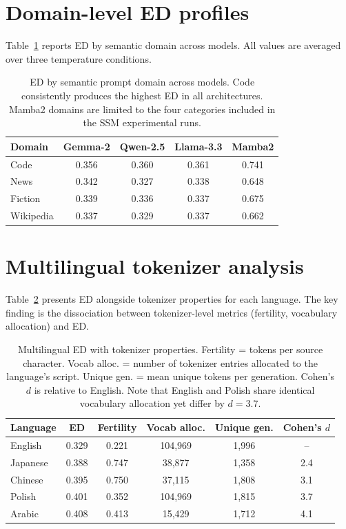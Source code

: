 \documentclass{article}
\begin{document}
\section{Domain-level ED profiles}
\label{app:domains}

Table~\ref{tab:domains} reports ED by semantic domain across models. All values are averaged over three temperature conditions.

\begin{table}[H]
\centering
\small
\begin{tabular}{lcccc}
\toprule
\textbf{Domain} & \textbf{Gemma-2} & \textbf{Qwen-2.5} & \textbf{Llama-3.3} & \textbf{Mamba2} \\
\midrule
Code & 0.356 & 0.360 & 0.361 & 0.741 \\
News & 0.342 & 0.327 & 0.338 & 0.648 \\
Fiction & 0.339 & 0.336 & 0.337 & 0.675 \\
Wikipedia & 0.337 & 0.329 & 0.337 & 0.662 \\
\bottomrule
\end{tabular}
\caption{ED by semantic prompt domain across models. Code consistently produces the highest ED in all architectures. Mamba2 domains are limited to the four categories included in the SSM experimental runs.}
\label{tab:domains}
\end{table}

\section{Multilingual tokenizer analysis}
\label{app:tokenizer}

Table~\ref{tab:multilingual} presents ED alongside tokenizer properties for each language. The key finding is the dissociation between tokenizer-level metrics (fertility, vocabulary allocation) and ED.

\begin{table}[H]
\centering
\small
\begin{tabular}{lccccc}
\toprule
\textbf{Language} & \textbf{ED} & \textbf{Fertility} & \textbf{Vocab alloc.} & \textbf{Unique gen.} & \textbf{Cohen's $d$} \\
\midrule
English & 0.329 & 0.221 & 104,969 & 1,996 & -- \\
Japanese & 0.388 & 0.747 & 38,877 & 1,358 & 2.4 \\
Chinese & 0.395 & 0.750 & 37,115 & 1,808 & 3.1 \\
Polish & 0.401 & 0.352 & 104,969 & 1,815 & 3.7 \\
Arabic & 0.408 & 0.413 & 15,429 & 1,712 & 4.1 \\
\bottomrule
\end{tabular}
\caption{Multilingual ED with tokenizer properties. Fertility = tokens per source character. Vocab alloc. = number of tokenizer entries allocated to the language's script. Unique gen. = mean unique tokens per generation. Cohen's $d$ is relative to English. Note that English and Polish share identical vocabulary allocation yet differ by $d = 3.7$.}
\label{tab:multilingual}
\end{table}
\end{document}

